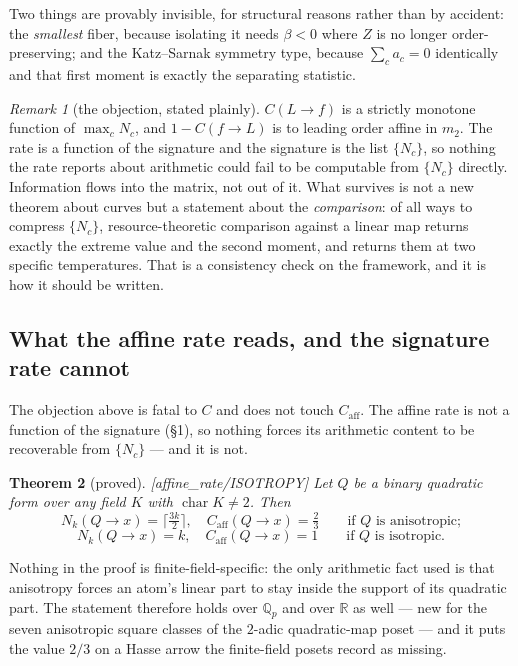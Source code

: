 \documentclass[11pt]{article}
\theoremstyle{plain}
\newtheorem{theorem}{Theorem}[section]
\theoremstyle{remark}
\newtheorem{remark}[theorem]{Remark}
\newcommand{\R}{\mathbb R}
\newcommand{\caff}{C_{\mathrm{aff}}}
\newcommand{\ra}{\rightarrow}
\newcommand{\source}[1]{{\normalfont\small\textsf{[#1]}}}
\begin{document}
Two things are provably invisible, for structural reasons rather than by
accident: the \emph{smallest} fiber, because isolating it needs $\beta < 0$
where $Z$ is no longer order-preserving; and the Katz--Sarnak symmetry type,
because $\sum_c a_c = 0$ identically and that first moment is exactly the
separating statistic.

\begin{remark}[the objection, stated plainly]
$C(L\ra f)$ is a strictly monotone function of $\max_c N_c$, and $1 - C(f\ra L)$
is to leading order affine in $m_2$.  The rate is a function of the signature
and the signature is the list $\{N_c\}$, so nothing the rate reports about
arithmetic could fail to be computable from $\{N_c\}$ directly.  Information
flows into the matrix, not out of it.  What survives is not a new theorem about
curves but a statement about the \emph{comparison}: of all ways to compress
$\{N_c\}$, resource-theoretic comparison against a linear map returns exactly
the extreme value and the second moment, and returns them at two specific
temperatures.  That is a consistency check on the framework, and it is how it
should be written.
\end{remark}

\subsection{What the affine rate reads, and the signature rate cannot}
\label{sub:isotropy}

The objection above is fatal to $C$ and does not touch $\caff$.  The affine rate
is not a function of the signature (\S1), so nothing forces its arithmetic
content to be recoverable from $\{N_c\}$ --- and it is not.

\begin{theorem}[proved]\label{thm:isotropy}
\source{affine\_rate/ISOTROPY}
Let $Q$ be a binary quadratic form over any field $K$ with
$\operatorname{char}K \neq 2$.  Then
\[
  N_k(Q\ra x) = \bigl\lceil \tfrac{3k}{2} \bigr\rceil,\quad
  \caff(Q\ra x)=\tfrac23 \qquad\text{if $Q$ is anisotropic;}
\]
\[
  N_k(Q\ra x) = k,\quad \caff(Q\ra x)=1 \qquad\text{if $Q$ is isotropic.}
\]
\end{theorem}

Nothing in the proof is finite-field-specific: the only arithmetic fact used is
that anisotropy forces an atom's linear part to stay inside the support of its
quadratic part.  The statement therefore holds over $\mathbb Q_p$ and over $\R$
as well --- new for the seven anisotropic square classes of the $2$-adic
quadratic-map poset --- and it puts the value $2/3$ on a Hasse arrow the
finite-field posets record as missing.
\end{document}
